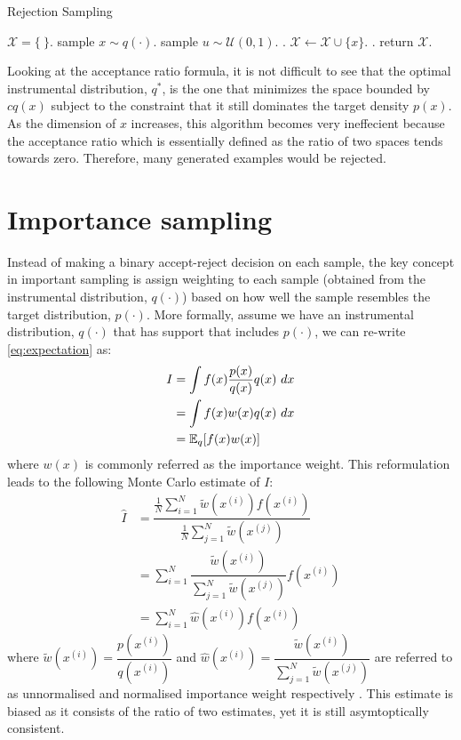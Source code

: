 \begin{algorithm}
\caption{Rejection Sampling}\label{algo:rejectionsampling}
\begin{algorithmic}[1]
\State $\mathcal{X} = \{\ \}$.
\Repeat
  \State sample $x \sim q(\cdot)$.
  \State sample $u \sim \mathcal{U}(0,1)$.
  .
    \State $\mathcal{X} \gets \mathcal{X} \cup \{x\}$.
  \EndIf
{}.
\State return $\mathcal{X}$.
\EndFunction
\end{algorithmic}
\end{algorithm}

Looking at the acceptance ratio formula, it is not difficult to see that the optimal instrumental distribution, $q^*$, is the one that minimizes the space bounded by $cq(x)$ subject to the constraint that it still dominates the target density $p(x)$. As the dimension of $x$ increases, this algorithm becomes very ineffecient because the acceptance ratio which is essentially defined as the ratio of two spaces tends towards zero. Therefore, many generated examples would be rejected. 

\section{Importance sampling}
\label{sec:IS}
Instead of making a binary accept-reject decision on each sample, the key concept in important sampling is assign weighting to each sample (obtained from the instrumental distribution, $q(\cdot)$) based on how well the sample resembles the target distribution, $p(\cdot)$. More formally, assume we have an instrumental distribution, $q(\cdot)$ that has support that includes $p(\cdot)$, we can re-write \eqref{eq:expectation} as:
\begin{align}
  I &= \int f(x)\dfrac{p(x)}{q(x)}q(x)~dx \nonumber \\
    &= \int f(x)w(x)q(x)~dx \nonumber \\
    &= \operatorname{\mathbb{E}}_q[f(x)w(x)]
\end{align}
where $w(x)$ is commonly referred as the importance weight. This reformulation leads to the following Monte Carlo estimate of $I$:
\begin{align}
  \hat{I} &= \dfrac{\frac{1}{N} \sum^N_{i=1} \tilde{w}(x^{(i)})f(x^{(i)})}{\frac{1}{N} \sum^N_{j=1} \tilde{w}(x^{(j)})} \nonumber \\ 
          &= \sum^N_{i=1} \dfrac{\tilde{w}(x^{(i)})}{\sum^N_{j=1} \tilde{w}(x^{(j)})} f(x^{(i)}) \nonumber \\
          &= \sum^N_{i=1} \hat{w}(x^{(i)}) f(x^{(i)})  \label{eq:is} 
\end{align}
where $\tilde{w}(x^{(i)}) = \dfrac{p(x^{(i)})}{q(x^{(i)})}$ and $\hat{w}(x^{(i)})  = \dfrac{\tilde{w}(x^{(i)})}{\sum^N_{j=1} \tilde{w}(x^{(j)})}$ are referred to as unnormalised and normalised importance weight respectively \cite{CO05}. This estimate is biased as it consists of the ratio of two estimates, yet it is still asymtoptically consistent.

